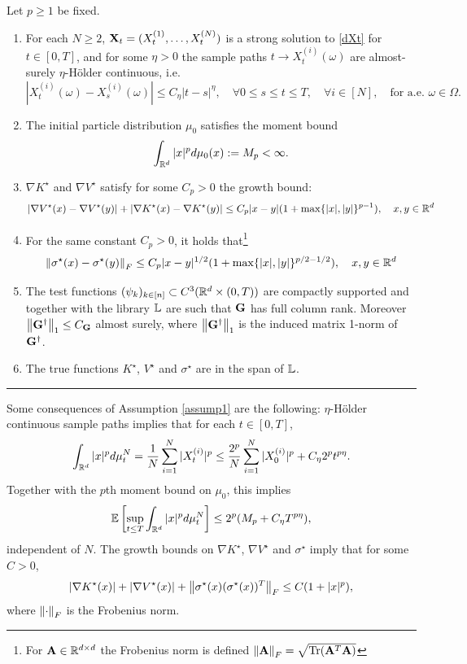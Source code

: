 \documentclass[english,reqno]{amsart}
\begin{document}
\begin{assump}\label{assump1}
Let $p\geq 1$ be fixed. 
\begin{enumerate}[label=(\Roman*)]
\item For each $N\geq 2$, $\mathbf{X}_t=(X^{(1)}_t,\dots,X^{(N)}_t)$ is a strong solution to \eqref{dXt} for $t\in[0,T]$, and for some $\eta>0$ the sample paths $t\to X^{(i)}_t(\omega)$ are almost-surely $\eta$-H\"older continuous, i.e.\
\[|X^{(i)}_t(\omega)-X^{(i)}_s(\omega)|\leq C_\eta|t-s|^\eta, \quad \forall 0\leq s\leq t\leq T,\quad  \forall i\in [N],\quad \text{for a.e. }\omega\in \Omega.\]
\item The initial particle distribution $\mu_0$ satisfies the moment bound 
\[\int_{\mathbb{R}^d}|x|^pd\mu_0(x):= M_p<\infty.\]
\item $\nabla K^\star$ and $\nabla V^\star$ satisfy for some $C_p>0$ the growth bound:
\[|\nabla V^\star(x) -\nabla V^\star(y)|+|\nabla K^\star(x) -\nabla K^\star(y)|\leq C_p|x-y|(1+\max\{|x|,|y|\}^{p-1}), \quad x,y\in \mathbb{R}^d\]
\item For the same constant $C_p>0$, it holds that\footnote{For $\mathbf{A}\in \mathbb{R}^{d\times d}$ the Frobenius norm is defined $\left\Vert {\mathbf{A}} \right\Vert_F=\sqrt{\text{Tr}(\mathbf{A}^T\mathbf{A})}$}
\[\left\Vert {\sigma^\star(x)-\sigma^\star(y)} \right\Vert_F\leq C_p|x-y|^{1/2}(1+\max\{|x|,|y|\}^{p/2-1/2}), \quad x,y\in \mathbb{R}^d\]
\item The test functions $(\psi_k)_{k\in[n]}\subset C^3(\mathbb{R}^d\times(0,T))$ are compactly supported and together with the library $\mathbb{L}$ are such that $\mathbf{G}$ has full column rank. Moreover $\left\Vert {\mathbf{G}^\dagger} \right\Vert_1\leq C_{\mathbf{G}}$ almost surely, where $\left\Vert {\mathbf{G}^\dagger} \right\Vert_1$ is the induced matrix 1-norm of $\mathbf{G}^\dagger$.
\item The true functions $K^\star$, $V^\star$ and $\sigma^\star$ are in the span of $\mathbb{L}$.
\end{enumerate}
\hrule
\end{assump}
\begin{rmrk} 
Some consequences of Assumption \ref{assump1} are the following: $\eta$-H\"older continuous sample paths implies that for each $t\in[0,T]$,
\[\int_{\mathbb{R}^d}|x|^pd\mu^N_t=\frac{1}{N}\sum_{i=1}^N|X^{(i)}_t|^p\leq \frac{2^p}{N}\sum_{i=1}^N|X^{(i)}_0|^p+C_\eta 2^pt^{p\eta}.\]
Together with the $p$th moment bound on $\mu_0$, this implies 
\begin{equation}\label{momentbound}
\mathbb{E}\left[\sup_{t\leq T}\int_{\mathbb{R}^d}|x|^pd\mu^N_t\right]\leq 2^p(M_p+C_\eta T^{p\eta}),
\end{equation}
independent of $N$. The growth bounds on $\nabla K^\star$, $\nabla V^\star$ and $\sigma^\star$ imply that for some $C>0$,
\begin{equation}\label{growthbound}
|\nabla K^\star(x)|+|\nabla V^\star(x)|+\left\Vert {\sigma^\star(x)(\sigma^\star(x))^T} \right\Vert_F\leq C(1+|x|^p),
\end{equation}
where $\left\Vert {\cdot} \right\Vert_F$ is the Frobenius norm. 
\end{rmrk}
\end{document}
